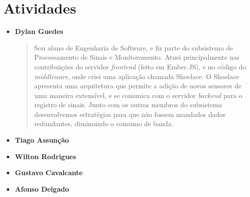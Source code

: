 \chapter{Atividades}
\label{chapter:atividades}

\begin{itemize}
    \item \textbf{Dylan Guedes}
    \begin{quote}
        Sou aluno de Engenharia de Software, e fiz parte do subsistema de
        Processamento de Sinais e Monitoramento. Atuei principalmente nas
        contribuições do servidor \textit{frontend} (feito em Ember.JS), e
        no código do \textit{middleware}, onde criei uma aplicação chamada
        Shoelace. O Shoelace apresenta uma arquitetura que permite a adição de
        novos sensores de uma maneira extensível, e se comunica com o servidor
        \textit{backend} para o registro de sinais. Junto com os outros membros
        do subsistema desenvolvemos estratégias para que não fossem mandados
        dados redundantes, diminuindo o consumo de banda.
    \end{quote}

    \item \textbf{Tiago Assunção}
    \begin{quote}
    \end{quote}

    \item \textbf{Wilton Rodrigues}
    \begin{quote}
    \end{quote}

    \item \textbf{Gustavo Cavalcante}
    \begin{quote}
    \end{quote}

    \item \textbf{Afonso Delgado}
    \begin{quote}
    \end{quote}
\end{itemize}

